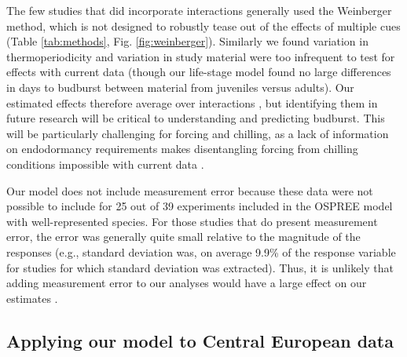 \documentclass{article}
\begin{document}
The few studies that did incorporate interactions generally used the Weinberger method, which is not designed to robustly tease out of the effects of multiple cues (Table \ref{tab:methods}, Fig. \ref{fig:weinberger}).  Similarly we found variation in thermoperiodicity and variation in study material were too infrequent to test for effects with current data (though our life-stage model found no large differences in days to budburst between material from juveniles versus adults). Our estimated effects therefore average over interactions \emph{\citep{gelman2006}}, but identifying them in future research will be critical to understanding and predicting budburst. This will be particularly challenging for forcing and chilling, as a lack of information on endodormancy requirements makes  disentangling forcing from chilling conditions impossible with current data \emph{\citep{chuine2016}}.
\par Our model does not include measurement error because these data were not possible to include for 25 out of 39 experiments included in the OSPREE model with well-represented species. For those studies that do present measurement error, the error was generally quite small relative to the magnitude of the responses (e.g., standard deviation was, on average 9.9\% of the  response variable for studies for which standard deviation was extracted). Thus, it is unlikely that adding measurement error to our analyses would have a large effect on our estimates \emph{\citep{rstan2019}}. \\
 



\subsection*{Applying our model to Central European data}
\end{document}
